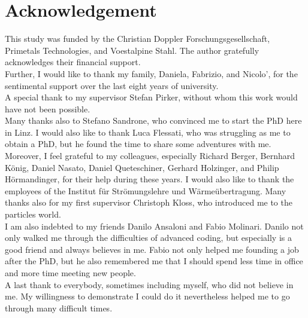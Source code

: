 \chapter*{Acknowledgement}
\label{cap:acknowledgement}
This study was funded by the Christian Doppler Forschungsgesellschaft, Primetals
Technologies, and Voestalpine Stahl. 
The author gratefully acknowledges their financial support.\\
Further, I would like to thank my family, Daniela, Fabrizio, and Nicolo', for
the sentimental support over the last eight years of university.\\
A special thank to my supervisor Stefan Pirker, without whom this work would
have not been possible.\\
Many thanks also to Stefano Sandrone, who convinced me to start the PhD here in
Linz.
I would also like to thank Luca Flessati, who was struggling as me to
obtain a PhD, but he found the time to share some adventures with me.\\
Moreover, I feel grateful to my colleagues, especially Richard Berger, Bernhard
K\"{o}nig, Daniel Nasato, Daniel Queteschiner, Gerhard Holzinger, and Philip
H\"{o}rmandinger, for their help during these years.
I would also like to thank the employees of the Institut f\"{u}r Str\"{o}mungslehre und
W\"{a}rme\"{u}bertragung.
Many thanks also for my first supervisor Christoph Kloss, who introduced me to
the particles world.\\
I am also indebted to my friends Danilo Ansaloni and Fabio Molinari. 
Danilo not only walked me through the difficulties of advanced coding, but
especially is a good friend and always believes in me. 
Fabio not only helped me founding a job after the PhD, but he also remembered me
that I should spend less time in office and more time meeting new people.\\
A last thank to everybody, sometimes including myself, who did not believe in
me. My willingness to demonstrate I could do it nevertheless helped me to go
through many difficult times.
